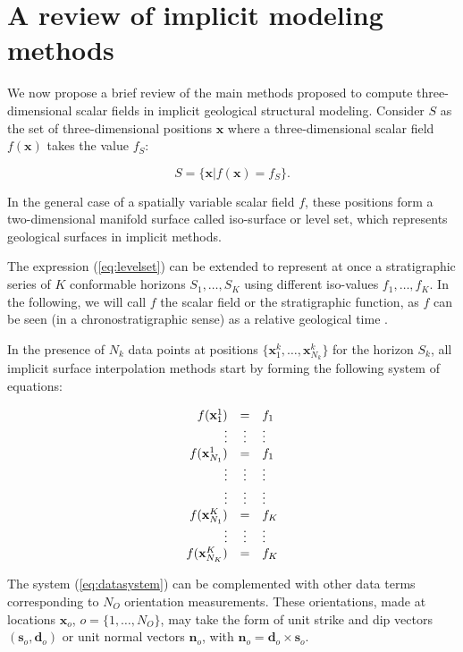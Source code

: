 \documentclass[preprint]{ring20}
\newcommand{\bx}{\mathbf{x}}
\newcommand{\bn}{\mathbf{n}}
\begin{document}
\section{A review of implicit modeling methods}
\label{sec:methods}

We now propose a brief review of the main methods proposed to compute three-dimensional scalar fields in implicit geological structural modeling. 
Consider $S$ as the set of three-dimensional positions $\bx$ where a three-dimensional scalar field $f(\bx)$ takes the value $f_S$: 

\begin{equation}
\label{eq:levelset}
  S = \{\bx | f(\bx) = f_S\}.
\end{equation}

In the general case of a spatially variable scalar field $f$, these positions form a two-dimensional manifold surface called iso-surface or level set, which represents geological surfaces in implicit methods. 

The expression (\ref{eq:levelset}) can be extended to represent 
at once a stratigraphic series of $K$ conformable horizons 
$S_1, \ldots, S_K$ using different iso-values $f_1, \ldots, f_K$. 
In the following, we will call $f$ the scalar field or the stratigraphic function, as $f$ can be seen 
(in a chronostratigraphic sense) as a relative geological time \citep{Mallet2004MG,Lomask2006G,Wu2012G}.

In the presence of $N_k$ data points at positions $\{\mathbf{x}_1^k, \ldots, \mathbf{x}_{N_k}^k\}$ for the horizon $S_k$, all implicit surface interpolation methods start by forming the following system of equations: 

\begin{equation}
\label{eq:datasystem}
\begin{array}{r c l}
f(\bx_1^1) & = & f_1 \\
\vdots & \vdots & \vdots \\
f(\bx_{N_1}^1) & = & f_1 \\
\vdots & \vdots & \vdots \\
\vdots & \vdots & \vdots \\
f(\bx_{N_1}^K) & = & f_K \\
\vdots & \vdots & \vdots \\
f(\bx_{N_K}^K) & = & f_K \\
\end{array}
\end{equation}

The system (\ref{eq:datasystem}) can be complemented with other data terms corresponding to $N_O$ orientation measurements. These orientations, made at locations 
$\bx_o$, $o = \{1, \ldots, N_O\}$, may take the form of unit strike and dip vectors $(\mathbf{s}_o, \mathbf{d}_o)$ or unit normal vectors $\bn_o$, with $\mathbf{n}_o = \mathbf{d}_o \times \mathbf{s}_o$.  
 
\end{document}
